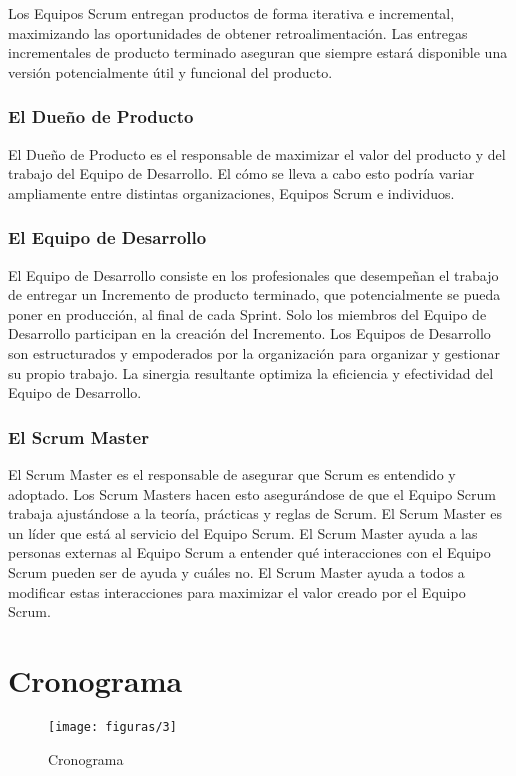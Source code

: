   Los Equipos Scrum entregan productos de forma iterativa e incremental, maximizando las oportunidades de obtener retroalimentación. Las entregas incrementales de producto terminado aseguran que siempre estará disponible una versión potencialmente útil y funcional del producto. 
  
  \subsubsection{El Dueño de Producto}
  El Dueño de Producto es el responsable de maximizar el valor del producto y del trabajo del Equipo de Desarrollo. El cómo se lleva a cabo esto podría variar ampliamente entre distintas organizaciones, Equipos Scrum e individuos.
  
  \subsubsection{El Equipo de Desarrollo}
  El Equipo de Desarrollo consiste en los profesionales que desempeñan el trabajo de entregar un Incremento de producto terminado, que potencialmente se pueda poner en producción, al final de cada Sprint. Solo los miembros del Equipo de Desarrollo participan en la creación del Incremento. Los Equipos de Desarrollo son estructurados y empoderados por la organización para organizar y gestionar su propio trabajo. La sinergia resultante optimiza la eficiencia y efectividad del Equipo de Desarrollo.
  
  \subsubsection{El Scrum Master}
  El Scrum Master es el responsable de asegurar que Scrum es entendido y adoptado. Los Scrum Masters hacen esto asegurándose de que el Equipo Scrum trabaja ajustándose a la teoría, prácticas y reglas de Scrum. El Scrum Master es un líder que está al servicio del Equipo Scrum. El Scrum Master ayuda a las personas externas al Equipo Scrum a entender qué interacciones con el Equipo Scrum pueden ser de ayuda y cuáles no. El Scrum Master ayuda a todos a modificar estas interacciones para maximizar el valor creado por el Equipo Scrum.

\section{Cronograma}
  \begin{figure}[H]
  	\centering
  	\texttt{[image: figuras/3]}
  	\captionsetup{width=.95\textwidth}
  	\caption{Cronograma}
  	\label{figura3}
  \end{figure}

